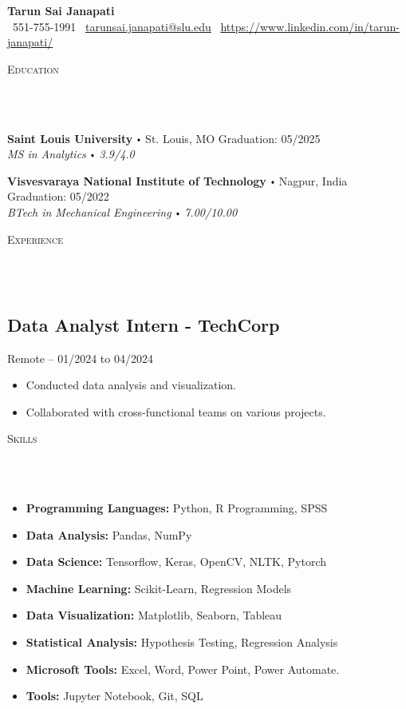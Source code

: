 \documentclass{article}
\newcommand{\school}[4]{
      \textbf{#1} \labelitemi #2 \hfill #3 \\ #4 \vspace*{5pt}
    }
\newcommand{\lineunder}{
      \vspace*{-8pt} \\ \hspace*{-18pt} 
      \hrulefill \\
      }
\newcommand{\header}[1]{{
      \hspace*{-15pt}\vspace*{6pt} \textsc{#1}} \vspace*{-6pt} 
      \lineunder
      }
\renewcommand{\labelitemi}{
      $\vcenter{\hbox{\tiny$\bullet$}}$\hspace*{3pt}
      }
\begin{document}
    \small
    \smallskip
    \vspace*{-44pt}

    \begin{center}
      {\LARGE \textbf{Tarun Sai Janapati}} \\
      \faPhone\ 551-755-1991 \quad
      \faEnvelope\ \href{mailto:tarunsai.janapati@slu.edu}{tarunsai.janapati@slu.edu} \quad
      \faLinkedin\ \url{https://www.linkedin.com/in/tarun-janapati/}
    \end{center}

    \vspace{15pt}

   \header{Education}

    {
        \school{Saint Louis University}{St. Louis, MO}{Graduation: 05/2025}{\textit{MS in Analytics \labelitemi 3.9/4.0}}
      

        \school{Visvesvaraya National Institute of Technology}{Nagpur, India}{Graduation: 05/2022}{\textit{BTech in Mechanical Engineering \labelitemi 7.00/10.00}}
      }

    \vspace*{4pt}%
    \header{Experience}

    {
          \subsection*{Data Analyst Intern - TechCorp}
          Remote -- 01/2024 to 04/2024
          \begin{itemize}
            \item Conducted data analysis and visualization.
\item Collaborated with cross-functional teams on various projects.
          \end{itemize}
        }
    
    \vspace*{4pt}%
    \header{Skills}

    \begin{itemize}
      \item \textbf{Programming Languages:} Python, R Programming, SPSS
      \item \textbf{Data Analysis:} Pandas, NumPy
      \item \textbf{Data Science:} Tensorflow, Keras, OpenCV, NLTK, Pytorch
      \item \textbf{Machine Learning:} Scikit-Learn, Regression Models
      \item \textbf{Data Visualization:} Matplotlib, Seaborn, Tableau
      \item \textbf{Statistical Analysis:} Hypothesis Testing, Regression Analysis
      \item \textbf{Microsoft Tools:} Excel, Word, Power Point, Power Automate.
      \item \textbf{Tools:} Jupyter Notebook, Git, SQL
    \end{itemize}
\end{document}
